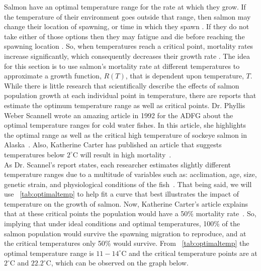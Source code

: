 Salmon have an optimal temperature range for the rate at which they grow. 
If the temperature of their environment goes outside that range, then salmon may change their location of spawning, or time in which they spawn \cite{ADFG-optimal}.
If they do not take either of those options then they may fatigue and die before reaching the spawning location \cite{ADFG-optimal, ADFG-critical}.
So, when temperatures reach a critical point, mortality rates increase significantly, which consequently decreases their growth rate \cite{ADFG-optimal}.
The idea for this section is to use salmon's mortality rate at different temperatures to approximate a growth function, $R(T)$, that is dependent upon temperature, $T$.
While there is little research that scientifically describe the effects of salmon population growth at each individual point in temperature, there are reports that estimate the optimum temperature range as well as critical points.
Dr. Phyllis Weber Scannell wrote an amazing article in 1992 for the ADFG about the optimal temperature ranges for cold water fishes.
In this article, she highlights the optimal range as well as the critical high temperature of sockeye salmon in Alaska~\cite{ADFG-optimal}.
Also, Katherine Carter has published an article that suggests temperatures below $2^{\circ}$C will result in high mortality~\cite{carter2005effects}.\\

As Dr. Scannel's report states, each researcher estimates slightly different temperature ranges due to a multitude of variables such as: acclimation, age, size, genetic strain, and physiological conditions of the fish~\cite{ADFG-optimal}.
That being said, we will use \tablename~\ref{tab:optimaltemp} to help fit a curve that best illustrates the impact of temperature on the growth of salmon.
Now, Katherine Carter's article explains that at these critical points the population would have a 50\% mortality rate~\cite{carter2005effects}.
So, implying that under ideal conditions and optimal temperatures, 100\% of the salmon population would survive the spawning migration to reproduce, and at the critical temperatures only 50\% would survive.
From \tablename~\ref{tab:optimaltemp} the optimal temperature range is $11-14^{\circ}$C and the critical temperature points are at $2^{\circ}$C and $22.2^{\circ}$C, which can be observed on the graph below.
